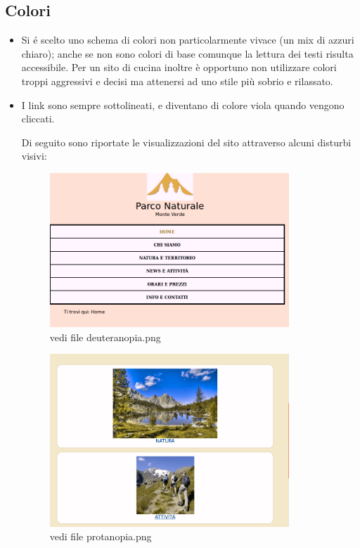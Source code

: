 \documentclass[12pt]{article}
\begin{document}
			\subsection{Colori}
			\begin{itemize}
				\item Si \'e scelto uno schema di colori non particolarmente vivace (un mix di azzuri chiaro); anche se non sono colori di base comunque la lettura dei testi risulta accessibile. Per un sito di cucina inoltre è opportuno non utilizzare colori troppi aggressivi e decisi ma attenersi ad uno stile più sobrio e rilassato. 

				\item I link sono sempre sottolineati, e diventano di colore viola quando vengono cliccati.

			Di seguito sono riportate le visualizzazioni del sito attraverso alcuni disturbi visivi:

			\begin{figure}
			\centering
			\includegraphics[width=90mm]{deuteranopia1}
			\caption{vedi file deuteranopia.png}
			\end{figure} 

			\begin{figure}
			\centering
			\includegraphics[width=90mm]{protanopia1}
			\caption{vedi file protanopia.png}
			\end{figure}


\end{itemize}
\end{document}

